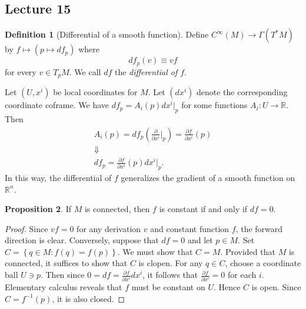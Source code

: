 \documentclass[10pt,letterpaper,cm]{nupset}
\theoremstyle{definition}
\newtheorem{definition}{Definition}[subsection]
\theoremstyle{theorem}
\newtheorem{prop}[definition]{Proposition}
\theoremstyle{remark}
\newcommand{\R}{\mathbb R}
\newcommand{\1}{\mathbf{1}}
\newcommand{\0}{\vec 0}
\begin{document}
\subsection{Lecture 15}

\begin{definition}[Differential of a smooth function]\label{diff}
Define $C^{\infty}(M) \to \Gamma(T^{\ast}M)$ by $f \mapsto \left(p\mapsto df_p\right)$ where $$df_p(v) \equiv vf$$ for every $v\in T_pM$. We call $df$ the \textit{differential of $f$}.
\end{definition}


Let $\left(U, x^i\right)$ be local coordinates for $M$. Let $\left(dx^i\right)$ denote the corresponding coordinate coframe. We have $df_p = A_i(p)dx^i\bigr\rvert_p$ for some functions $A_i : U \to \R$. Then 
\begin{gather*}
A_i(p) = df_p\left(\frac{\partial}{\partial{x^i}}\bigr\rvert_p\right) = \frac{\partial{f}}{\partial{x^i}}(p)
\\ \Downarrow
\\ df_p = \frac{\partial{f}}{\partial{x^i}}(p) dx^i\bigr\rvert_p.
\end{gather*} In this way, the differential of $f$ generalizes the gradient of a smooth function on $\R^n$.


\begin{prop}
If $M$ is connected, then $f$ is constant if and only if $df = 0$. 
\end{prop}
\begin{proof}
Since $vf = 0$ for any derivation $v$ and constant function $f$, the forward direction is clear. Conversely, suppose that $df = 0$ and let $p\in M$. Set $C = \left\{q \in M : f(q) = f(p)\right\}$. We must show that $C = M$. Provided that $M$ is connected, it suffices to show that $C$ is clopen. For any $q\in C$, choose a coordinate ball $U\ni p$. Then since $0 = df = \frac{\partial{f}}{\partial{x^i}}dx^i$, it follows that $\frac{\partial{f}}{\partial{x^i}} = 0$ for each $i$. Elementary calculus reveals that $f$ must be constant on $U$. Hence $C$ is open. Since $C = f^{-1}(p)$, it is also closed.
\end{proof}
\end{document}
